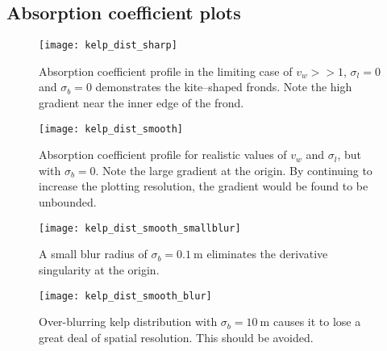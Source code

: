 \subsection{Absorption coefficient plots}
\begin{figure}[H]
  \centering
  \texttt{[image: kelp\_dist\_sharp]}
  \caption{Absorption coefficient profile in the limiting case of $v_w>>1$, $\sigma_l=0$ and $\sigma_b=0$ demonstrates the kite--shaped fronds. Note the high gradient near the inner edge of the frond.}
  \label{fig:kelp_dist_sharp}
\end{figure}
\begin{figure}[H]
  \centering
  \vspace{-3em}
  \texttt{[image: kelp\_dist\_smooth]}
  \caption{Absorption coefficient profile for realistic values of $v_w$ and $\sigma_l$, but with $\sigma_b=0$. Note the large gradient at the origin. By continuing to increase the plotting resolution, the gradient would be found to be unbounded.}
  \label{fig:kelp_dist_smooth}
\end{figure}
\begin{figure}[H]
  \centering
  \vspace{-3em}
  \texttt{[image: kelp\_dist\_smooth\_smallblur]}
  \caption{A small blur radius of $\sigma_b=\SI{0.1}{\m}$ eliminates the derivative singularity at the origin.}
  \label{fig:kelp_dist_smooth_smallblur}
\end{figure}
\begin{figure}[H]
  \centering
  \vspace{-3em}
  \texttt{[image: kelp\_dist\_smooth\_blur]}
  \caption{Over-blurring kelp distribution with $\sigma_b=\SI{10}{\m}$ causes it to lose a great deal of spatial resolution. This should be avoided.}
  \label{fig:kelp_dist_smooth_blur}
\end{figure}
